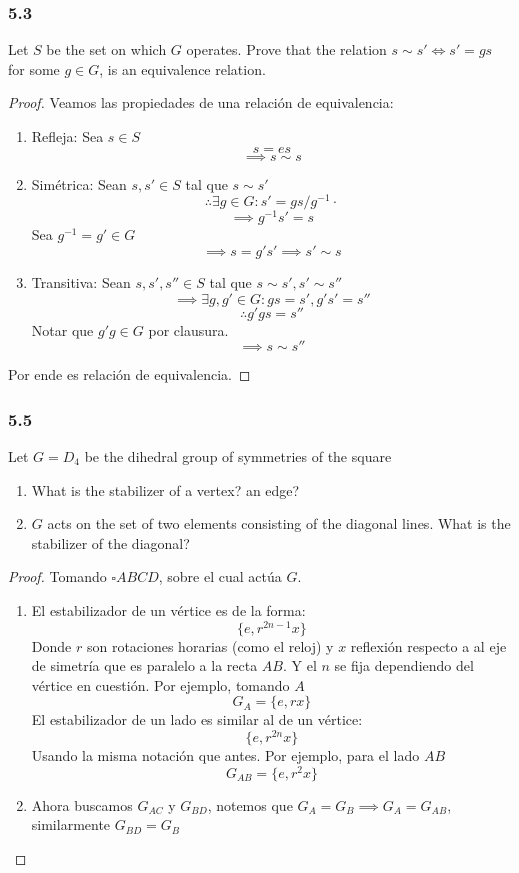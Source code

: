 \documentclass[11pt]{article}
\theoremstyle{definition}
\begin{document}
\subsubsection{5.3}
Let $S$ be the set on which $G$ operates. Prove that the relation $s\sim s'\iff s'=gs$ for some $g\in G$, is an equivalence relation.
\begin{proof}
    Veamos las propiedades de una relación de equivalencia:
    \begin{enumerate}
        \item Refleja: Sea $s\in S$
        \[s=es\]
        \[\implies s\sim s\]

        \item Simétrica: Sean $s,s'\in S$ tal que $s\sim s'$
        \[\therefore\exists g\in G: s'=gs/g^{-1}\cdot\]
        \[\implies g^{-1}s'=s\]
        Sea $g^{-1}=g'\in G$
        \[\implies s=g's'\implies s'\sim s\]

        \item Transitiva: Sean $s,s',s''\in S$ tal que $s\sim s',s'\sim s''$
        \[\implies \exists g,g'\in G: gs=s', g's'=s''\]
        \[\therefore g'gs=s''\]
        Notar que $g'g\in G$ por clausura.
        \[\implies s\sim s''\]
    \end{enumerate}
    Por ende es relación de equivalencia.
\end{proof}
\subsubsection{5.5}
Let $G=D_4$ be the dihedral group of symmetries of the square
\begin{enumerate}[label=(\alph*)]
    \item What is the stabilizer of a vertex? an edge?

    \item $G$ acts on the set of two elements consisting of the diagonal lines. What is the stabilizer of the diagonal?
\end{enumerate}
\begin{proof}
    Tomando $\square ABCD$, sobre el cual actúa $G$.
    \begin{enumerate}[label=(\alph*)]
        \item El estabilizador de un vértice es de la forma:
        \[\{e,r^{2n-1}x\}\]
        Donde $r$ son rotaciones horarias (como el reloj) y $x$ reflexión respecto a al eje de simetría que es paralelo a la recta $AB$. Y el $n$ se fija dependiendo del vértice en cuestión. Por ejemplo, tomando $A$
        \[G_A=\{e,rx\}\]
        El estabilizador de un lado es similar al de un vértice:
        \[\{e,r^{2n}x\}\]
        Usando la misma notación que antes. Por ejemplo, para el lado $AB$
        \[G_{AB}=\{e,r^2x\}\]

        \item Ahora buscamos $G_{AC}$ y $G_{BD}$, notemos que $G_A=G_B\implies G_A=G_{AB}$, similarmente $G_{BD}=G_B$ 
    \end{enumerate}
\end{proof}
\end{document}

